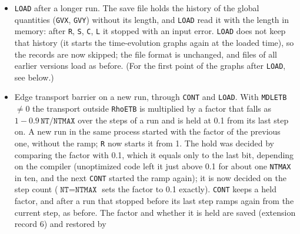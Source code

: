\documentclass[11pt]{article}
\begin{document}
\begin{itemize}
  \texttt{MDOSQZ} = \texttt{MDOSQZN} = 1): a run repeated in the same process (\texttt{R} answered
  with ``y''), or after a change of \texttt{NRMAX}, did not reproduce the first.  The list was also
  never rebuilt, while the variable of a term depends on the input: after a change of
  \texttt{FSTPTM}, \texttt{MDBEAM} or \texttt{MDFIXT} between runs in one process the stale list
  removed coefficients of other variables (an $O(1)$ error after \texttt{FSTPTM} 4 $\to$ 0).  The
  terms are now found on every call.  A repeated run, a run after a change of input, and a fresh
  process with that input agree bit for bit; the first run of a fresh process changes by round-off
  (it is the second run of the former code): at 1\,s, with and without NBI, with CDBM and with fixed
  transport, the densities and temperatures change by less than $4\times10^{-7}$ and \texttt{LQm2}
  by $6\times10^{-5}$, and the number of sweeps by 0.1\%.  A run started by \texttt{LOAD} is unchanged.
\item \texttt{LOAD} after a longer run.  The save file holds the history of the global quantities
  (\texttt{GVX}, \texttt{GVY}) without its length, and \texttt{LOAD} read it with the length in
  memory: after \texttt{R}, \texttt{S}, \texttt{C}, \texttt{L} it stopped with an input error.
  \texttt{LOAD} does not keep that history (it starts the time-evolution graphs again at the loaded
  time), so the records are now skipped; the file format is unchanged, and files of all earlier
  versions load as before.  (For the first point of the graphs after \texttt{LOAD}, see below.)
\item Edge transport barrier on a new run, through \texttt{CONT} and \texttt{LOAD}.  With
  \texttt{MDLETB} $\neq 0$ the transport outside \texttt{RhoETB} is multiplied by a factor that falls as
  $1 - 0.9\,\texttt{NT}/\texttt{NTMAX}$ over the steps of a run and is held at 0.1 from its last step
  on.  A new run in the same process started with the factor of the previous one, without the ramp;
  \texttt{R} now starts it from 1.  The hold was decided by comparing the factor with 0.1, which it
  equals only to the last bit, depending on the compiler (unoptimized code left it just above 0.1 for
  about one \texttt{NTMAX} in ten, and the next \texttt{CONT} started the ramp again); it is now decided
  on the step count ($\texttt{NT} = \texttt{NTMAX}$ sets the factor to 0.1 exactly).  \texttt{CONT}
  keeps a held factor, and after a run that stopped before its last step ramps again from the current
  step, as before.  The factor and whether it is held are saved (extension record 6) and restored by

\end{itemize}
\end{document}
